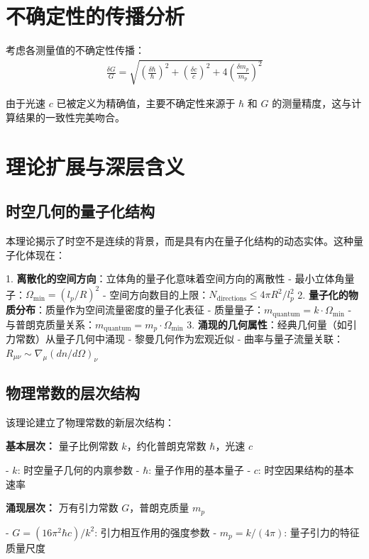 \documentclass[12pt,twocolumn]{article}
\begin{document}
\section{不确定性的传播分析}

考虑各测量值的不确定性传播：
\begin{align}
    \frac{\delta G}{G} = \sqrt{\left(\frac{\delta \hbar}{\hbar}\right)^2 + \left(\frac{\delta c}{c}\right)^2 + 4\left(\frac{\delta m_p}{m_p}\right)^2}
\end{align}

由于光速 $c$ 已被定义为精确值，主要不确定性来源于 $\hbar$ 和 $G$ 的测量精度，这与计算结果的一致性完美吻合。

\section{理论扩展与深层含义}

\subsection{时空几何的量子化结构}

本理论揭示了时空不是连续的背景，而是具有内在量子化结构的动态实体。这种量子化体现在：

1. \textbf{离散化的空间方向}：立体角的量子化意味着空间方向的离散性
    - 最小立体角量子：$\Omega_{\text{min}} = (l_p/R)^2$
    - 空间方向数目的上限：$N_{\text{directions}} \leq 4\pi R^2/l_p^2$
2. \textbf{量子化的物质分布}：质量作为空间流量密度的量子化表征
    - 质量量子：$m_{\text{quantum}} = k \cdot \Omega_{\text{min}}$
    - 与普朗克质量关系：$m_{\text{quantum}} = m_p \cdot \Omega_{\text{min}}$
3. \textbf{涌现的几何属性}：经典几何量（如引力常数）从量子几何中涌现
    - 黎曼几何作为宏观近似
    - 曲率与量子流量关联：$R_{\mu\nu} \sim \nabla_\mu (dn/d\Omega)_\nu$

\subsection{物理常数的层次结构}

该理论建立了物理常数的新层次结构：

\textbf{基本层次：} 量子比例常数 $k$，约化普朗克常数 $\hbar$，光速 $c$

- $k$: 时空量子几何的内禀参数
- $\hbar$: 量子作用的基本量子
- $c$: 时空因果结构的基本速率

\textbf{涌现层次：} 万有引力常数 $G$，普朗克质量 $m_p$

- $G = (16\pi^2 \hbar c)/k^2$: 引力相互作用的强度参数
- $m_p = k/(4\pi)$: 量子引力的特征质量尺度
\end{document}
